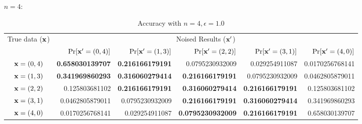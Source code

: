 \documentclass{article}
\begin{document}
\clearpage
$n = 4:$
\begin{table}[htbp]
	\vspace{-0.5cm}
	\scriptsize
	\centering
	\caption{Accuracy with $n = 4, \epsilon = 1.0$}
	\label{tab_n4prob}
\begin{tabular}{|c||r|r|r|r|r|}
	\hline

	\multirow{2}{*}{True data ($\textbf{x}$)}
								& \multicolumn{5}{c|}{Noised Results ($\textbf{x}'$)}  
								\\ \cline{2-6}
	                      		&  $\Pr[\textbf{x}' = (0, 4)]$  	
	                      		&  $\Pr[\textbf{x}' = (1, 3)]$ 	
	                      		&  $\Pr[\textbf{x}' = (2, 2)]$ 	
	                      		&  $\Pr[\textbf{x}' = (3, 1)]$ 	
	                      		&  $\Pr[\textbf{x}' = (4, 0)]$ 	
	                      		\\  \hline
	                      		\hline
	$\textbf{x} = (0,4)$          & {\bf 0.658030139707}	
								& {\bf 0.216166179191}	
								&  0.0795230932009
								&  0.029254911087
								&  0.0170256768141
								\\  \hline
	$\textbf{x} = (1,3)$          & {\bf 0.341969860293}	
								& {\bf 0.316060279414}			
								& {\bf 0.216166179191}
								&  0.0795230932009
								&  0.0462805879011
								\\  \hline
	$\textbf{x} = (2,2)$          & 0.125803681102
								& {\bf 0.216166179191}			
								& {\bf 0.316060279414}
								& {\bf 0.216166179191} 
								&  0.125803681102
								\\  \hline
	$\textbf{x} = (3,1)$          & 0.0462805879011
								& 0.0795230932009 			
								& {\bf 0.216166179191}
								& {\bf 0.316060279414} 
								&  0.341969860293
								\\  \hline
	$\textbf{x} = (4,0)$          & 0.0170256768141
								& 0.029254911087 			
								& {\bf 0.0795230932009}
								& {\bf 0.216166179191} 
								&  0.658030139707
								\\  \hline
\end{tabular}
\vspace{-0.5cm}
\end{table}
\end{document}
